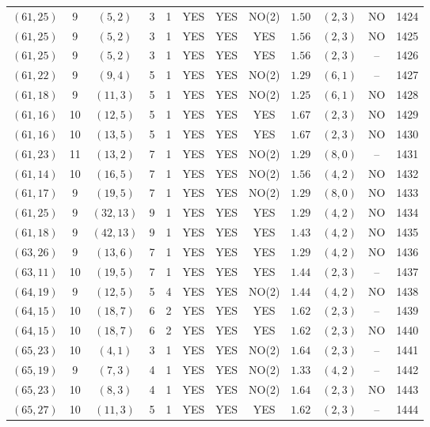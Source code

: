 \begin{longtable}{|c|c|c|c|c|c|c|c|c|c|c|c|}
$(61,25)$ & 9 & $(5,2)$ & 3 & 1 & YES & YES & NO(2) & $1.50$ & $(2,3)$ & NO & 1424\\
$(61,25)$ & 9 & $(5,2)$ & 3 & 1 & YES & YES & YES & $1.56$ & $(2,3)$ & NO & 1425\\
$(61,25)$ & 9 & $(5,2)$ & 3 & 1 & YES & YES & YES & $1.56$ & $(2,3)$ & -- & 1426\\
$(61,22)$ & 9 & $(9,4)$ & 5 & 1 & YES & YES & NO(2) & $1.29$ & $(6,1)$ & -- & 1427\\
$(61,18)$ & 9 & $(11,3)$ & 5 & 1 & YES & YES & NO(2) & $1.25$ & $(6,1)$ & NO & 1428\\
$(61,16)$ & 10 & $(12,5)$ & 5 & 1 & YES & YES & YES & $1.67$ & $(2,3)$ & NO & 1429\\
$(61,16)$ & 10 & $(13,5)$ & 5 & 1 & YES & YES & YES & $1.67$ & $(2,3)$ & NO & 1430\\
$(61,23)$ & 11 & $(13,2)$ & 7 & 1 & YES & YES & NO(2) & $1.29$ & $(8,0)$ & -- & 1431\\
$(61,14)$ & 10 & $(16,5)$ & 7 & 1 & YES & YES & NO(2) & $1.56$ & $(4,2)$ & NO & 1432\\
$(61,17)$ & 9 & $(19,5)$ & 7 & 1 & YES & YES & NO(2) & $1.29$ & $(8,0)$ & NO & 1433\\
$(61,25)$ & 9 & $(32,13)$ & 9 & 1 & YES & YES & YES & $1.29$ & $(4,2)$ & NO & 1434\\
$(61,18)$ & 9 & $(42,13)$ & 9 & 1 & YES & YES & YES & $1.43$ & $(4,2)$ & NO & 1435\\
$(63,26)$ & 9 & $(13,6)$ & 7 & 1 & YES & YES & YES & $1.29$ & $(4,2)$ & NO & 1436\\
$(63,11)$ & 10 & $(19,5)$ & 7 & 1 & YES & YES & YES & $1.44$ & $(2,3)$ & -- & 1437\\
$(64,19)$ & 9 & $(12,5)$ & 5 & 4 & YES & YES & NO(2) & $1.44$ & $(4,2)$ & NO & 1438\\
$(64,15)$ & 10 & $(18,7)$ & 6 & 2 & YES & YES & YES & $1.62$ & $(2,3)$ & -- & 1439\\
$(64,15)$ & 10 & $(18,7)$ & 6 & 2 & YES & YES & YES & $1.62$ & $(2,3)$ & NO & 1440\\
$(65,23)$ & 10 & $(4,1)$ & 3 & 1 & YES & YES & NO(2) & $1.64$ & $(2,3)$ & -- & 1441\\
$(65,19)$ & 9 & $(7,3)$ & 4 & 1 & YES & YES & NO(2) & $1.33$ & $(4,2)$ & -- & 1442\\
$(65,23)$ & 10 & $(8,3)$ & 4 & 1 & YES & YES & NO(2) & $1.64$ & $(2,3)$ & NO & 1443\\
$(65,27)$ & 10 & $(11,3)$ & 5 & 1 & YES & YES & YES & $1.62$ & $(2,3)$ & -- & 1444\\

\end{longtable}
